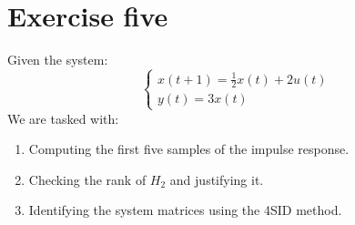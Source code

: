 \section{Exercise five}

Given the system: 
\[\begin{cases}
    x(t+1)=\frac{1}{2}x(t)+2u(t) \\
    y(t)=3x(t)
\end{cases}\]
We are tasked with:
\begin{enumerate}
    \item Computing the first five samples of the impulse response.
    \item Checking the rank of $H_2$ and justifying it.
    \item Identifying the system matrices using the 4SID method.
\end{enumerate}


